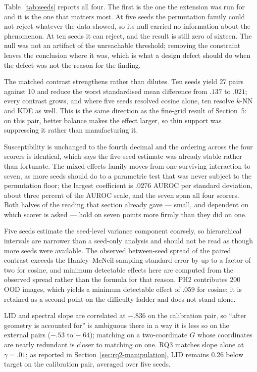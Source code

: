 \documentclass[11pt,a4paper]{article}
\begin{document}
Table~\ref{tab:seeds} reports all four. The first is the one the extension was
run for and it is the one that matters most. At five seeds the permutation
family could not reject whatever the data showed, so its null carried no
information about the phenomenon. At ten seeds it can reject, and the result is
still zero of sixteen. The null was not an artifact of the unreachable
threshold; removing the constraint leaves the conclusion where it was, which is
what a design defect should do when the defect was not the reason for the
finding.

The matched contrast strengthens rather than dilutes. Ten seeds yield 27 pairs
against 10 and reduce the worst standardised mean difference from $.137$ to
$.021$; every contrast grows, and where five seeds resolved cosine alone, ten resolve $k$-NN and KDE as well. This
is the same direction as the fine-grid result of Section~5: on this pair, better
balance makes the effect larger, so thin support was suppressing it rather than
manufacturing it.

Susceptibility is unchanged to the fourth decimal and the ordering across the
four scorers is identical, which says the five-seed estimate was already stable
rather than fortunate. The mixed-effects family moves from one surviving
interaction to seven, as more seeds should do to a parametric test that was
never subject to the permutation floor; the largest coefficient is $.0276$
AUROC per standard deviation, about three percent of the AUROC scale, and the
seven span all four scorers. Both halves of the reading that section already
gave --- small, and dependent on which scorer is asked --- hold on seven points
more firmly than they did on one.

Five seeds estimate the seed-level variance component coarsely, so hierarchical intervals are narrower than a seed-only analysis and should not be read as though more seeds were available. The observed between-seed spread of the paired contrast exceeds the Hanley--McNeil sampling standard error by up to a factor of two for cosine, and minimum detectable effects here are computed from the observed spread rather than the formula for that reason. PH2 contributes 200 OOD images, which yields a minimum detectable effect of .059 for cosine; it is retained as a second point on the difficulty ladder and does not stand alone.

LID and spectral slope are correlated at $-.836$ on the calibration pair, so ``after geometry is accounted for'' is ambiguous there in a way it is less so on the external pairs ($-.53$ to $-.64$); matching on a two-coordinate $G$ whose coordinates are nearly redundant is closer to matching on one. RQ3 matches slope alone at $\gamma=.01$; as reported in Section~\ref{sec:rq2-manipulation}, LID remains 0.26 below target on the calibration pair, averaged over five seeds.
\end{document}
